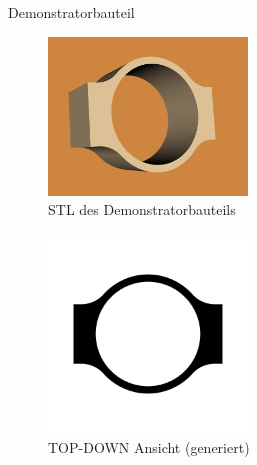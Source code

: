 \documentclass[../slides.tex]{subfiles}
\begin{document}
\begin{frame}{Demonstratorbauteil}
  \begin{minipage}[h]{.49\textwidth}
    \begin{figure}[]
      \includegraphics[width=150pt]{img_niklas/base_image.png}
      \caption{STL des Demonstratorbauteils}
    \end{figure}
  \end{minipage}
  \hfill
  \begin{minipage}[h]{.49\textwidth}
    \begin{figure}[]
      \includegraphics[width=150pt]{img_niklas/base_top_down.png}
      \caption{TOP-DOWN Ansicht (generiert)}
    \end{figure}
  \end{minipage}
\end{frame}
\end{document}
